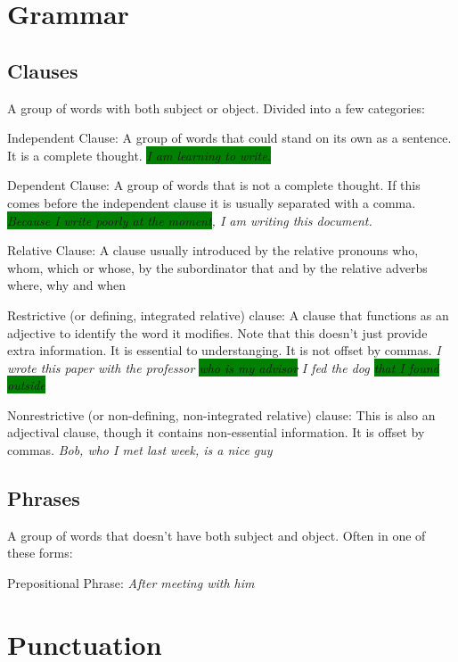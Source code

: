 \documentclass{article}
\newcommand{\hl}[1]{\colorbox{green}{#1}}
\newcommand{\example}[1]{\newline \textit{#1}}
\begin{document}
\section{Grammar}

\subsection{Clauses}

A group of words with both subject or object. Divided into a few categories:

Independent Clause: A group of words that could stand on its own as a sentence. It is a complete thought.
\example{\hl{I am learning to write.}}


Dependent Clause: A group of words that is not a complete thought. If this comes before the independent clause it is usually separated with a comma.
\example{\hl{Because I write poorly at the moment}, I am writing this document.}

Relative Clause: A clause usually introduced by the relative pronouns who, whom, which or whose, by the subordinator that and by the relative adverbs where, why and when


Restrictive (or defining, integrated relative) clause: A clause that functions as an adjective to identify the word it modifies. Note that this doesn't just provide extra information. It is essential to understanging. It is not offset by commas.
\example{I wrote this paper with the professor \hl{who is my advisor}}
\example{I fed the dog \hl{that I found outside}}

Nonrestrictive (or non-defining, non-integrated relative) clause: This is also an adjectival clause, though it contains non-essential information. It is offset by commas.
\example{Bob, who I met last week, is a nice guy}


\subsection{Phrases}

A group of words that doesn't have both subject and object. Often in one of these forms:

Prepositional Phrase:
\example{After meeting with him}





\section{Punctuation}
\end{document}
